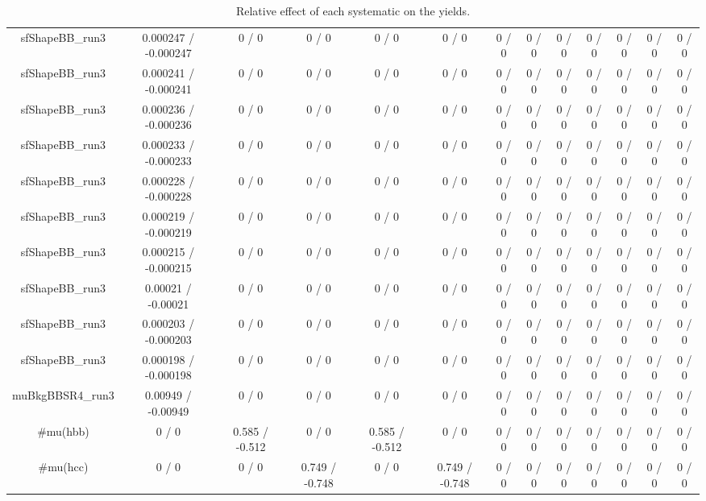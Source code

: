 \documentclass[10pt]{article}
\begin{document}
\begin{table}[htbp]
\begin{center}
\begin{tabular}{|c|c|c|c|c|c|c|c|c|c|c|c|c|}
  sfShapeBB_run3 & 0.000247 / -0.000247 & 0 / 0 & 0 / 0 & 0 / 0 & 0 / 0 & 0 / 0 & 0 / 0 & 0 / 0 & 0 / 0 & 0 / 0 & 0 / 0 & 0 / 0 \\ 
  sfShapeBB_run3 & 0.000241 / -0.000241 & 0 / 0 & 0 / 0 & 0 / 0 & 0 / 0 & 0 / 0 & 0 / 0 & 0 / 0 & 0 / 0 & 0 / 0 & 0 / 0 & 0 / 0 \\ 
  sfShapeBB_run3 & 0.000236 / -0.000236 & 0 / 0 & 0 / 0 & 0 / 0 & 0 / 0 & 0 / 0 & 0 / 0 & 0 / 0 & 0 / 0 & 0 / 0 & 0 / 0 & 0 / 0 \\ 
  sfShapeBB_run3 & 0.000233 / -0.000233 & 0 / 0 & 0 / 0 & 0 / 0 & 0 / 0 & 0 / 0 & 0 / 0 & 0 / 0 & 0 / 0 & 0 / 0 & 0 / 0 & 0 / 0 \\ 
  sfShapeBB_run3 & 0.000228 / -0.000228 & 0 / 0 & 0 / 0 & 0 / 0 & 0 / 0 & 0 / 0 & 0 / 0 & 0 / 0 & 0 / 0 & 0 / 0 & 0 / 0 & 0 / 0 \\ 
  sfShapeBB_run3 & 0.000219 / -0.000219 & 0 / 0 & 0 / 0 & 0 / 0 & 0 / 0 & 0 / 0 & 0 / 0 & 0 / 0 & 0 / 0 & 0 / 0 & 0 / 0 & 0 / 0 \\ 
  sfShapeBB_run3 & 0.000215 / -0.000215 & 0 / 0 & 0 / 0 & 0 / 0 & 0 / 0 & 0 / 0 & 0 / 0 & 0 / 0 & 0 / 0 & 0 / 0 & 0 / 0 & 0 / 0 \\ 
  sfShapeBB_run3 & 0.00021 / -0.00021 & 0 / 0 & 0 / 0 & 0 / 0 & 0 / 0 & 0 / 0 & 0 / 0 & 0 / 0 & 0 / 0 & 0 / 0 & 0 / 0 & 0 / 0 \\ 
  sfShapeBB_run3 & 0.000203 / -0.000203 & 0 / 0 & 0 / 0 & 0 / 0 & 0 / 0 & 0 / 0 & 0 / 0 & 0 / 0 & 0 / 0 & 0 / 0 & 0 / 0 & 0 / 0 \\ 
  sfShapeBB_run3 & 0.000198 / -0.000198 & 0 / 0 & 0 / 0 & 0 / 0 & 0 / 0 & 0 / 0 & 0 / 0 & 0 / 0 & 0 / 0 & 0 / 0 & 0 / 0 & 0 / 0 \\ 
  muBkgBBSR4_run3 & 0.00949 / -0.00949 & 0 / 0 & 0 / 0 & 0 / 0 & 0 / 0 & 0 / 0 & 0 / 0 & 0 / 0 & 0 / 0 & 0 / 0 & 0 / 0 & 0 / 0 \\ 
  #mu(hbb) & 0 / 0 & 0.585 / -0.512 & 0 / 0 & 0.585 / -0.512 & 0 / 0 & 0 / 0 & 0 / 0 & 0 / 0 & 0 / 0 & 0 / 0 & 0 / 0 & 0 / 0 \\ 
  #mu(hcc) & 0 / 0 & 0 / 0 & 0.749 / -0.748 & 0 / 0 & 0.749 / -0.748 & 0 / 0 & 0 / 0 & 0 / 0 & 0 / 0 & 0 / 0 & 0 / 0 & 0 / 0 \\ 
\hline 
\end{tabular} 
\caption{Relative effect of each systematic on the yields.} 
\end{center} 
\end{table} 
\end{document}
